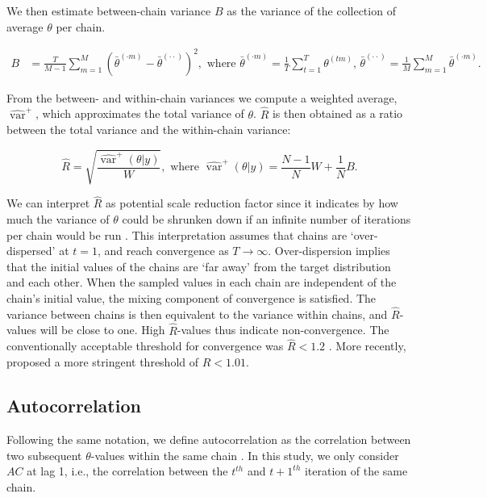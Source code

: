 \documentclass[Royal,times,sageh]{sagej}
\begin{document}
\noindent We then estimate between-chain variance \(B\) as the variance of the collection of average \(\theta\) per chain.

\begin{align*}
B&=\frac{T}{M-1} \sum_{m=1}^{M}\left(\bar{\theta}^{(\cdot m)}-\bar{\theta}^{(\cdot \cdot)}\right)^{2}, \text { where } \bar{\theta}^{(\cdot m)}=\frac{1}{T} \sum_{t=1}^{T} \theta^{(t m)} \text{, } \bar{\theta}^{(\cdot \cdot)}=\frac{1}{M} \sum_{m=1}^{M} \bar{\theta}^{(\cdot m)}. 
\end{align*}

\noindent From the between- and within-chain variances we compute a weighted average, \(\widehat{\operatorname{var}}^{+}\), which approximates the total variance of \(\theta\). \(\widehat{R}\) is then obtained as a ratio between the total variance and the within-chain variance:

\begin{equation*}
\widehat{R}=\sqrt{\frac{\widehat{\operatorname{var}}^{+}(\theta | y)}{W}},
\text{ where } \widehat{\operatorname{var}}^{+}(\theta | y)=\frac{N-1}{N} W+\frac{1}{N} B.
\end{equation*}

We can interpret \(\widehat{R}\) as potential scale reduction factor since it indicates by how much the variance of \(\theta\) could be shrunken down if an infinite number of iterations per chain would be run \citep{gelm92}. This interpretation assumes that chains are `over-dispersed' at \(t=1\), and reach convergence as \(T \to \infty\). Over-dispersion implies that the initial values of the chains are `far away' from the target distribution and each other. When the sampled values in each chain are independent of the chain's initial value, the mixing component of convergence is satisfied. The variance between chains is then equivalent to the variance within chains, and \(\widehat{R}\)-values will be close to one. High \(\widehat{R}\)-values thus indicate non-convergence. The conventionally acceptable threshold for convergence was \(\widehat{R} < 1.2\) \citep{gelm92}. More recently, \citet{veht19} proposed a more stringent threshold of \(\widehat{R} < 1.01\).

\hypertarget{autocorrelation}{%
\subsection{Autocorrelation}\label{autocorrelation}}

Following the same notation, we define autocorrelation as the correlation between two subsequent \(\theta\)-values within the same chain \citep[p.~147]{lync07}. In this study, we only consider \(AC\) at lag 1, i.e., the correlation between the \(t^{th}\) and \(t+1^{th}\) iteration of the same chain.
\end{document}
